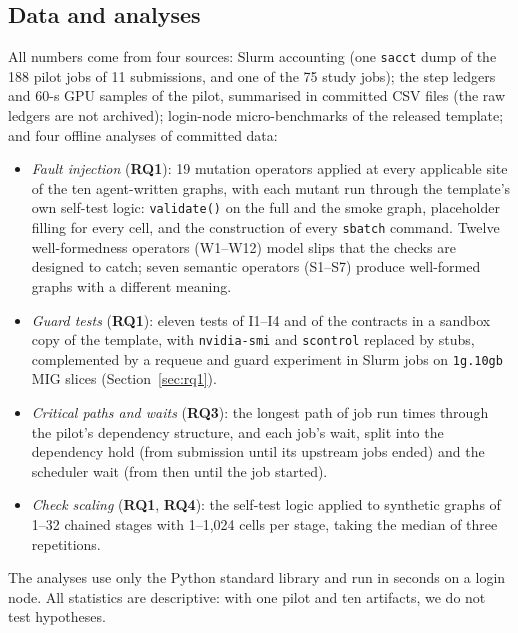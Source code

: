 \documentclass[pdflatex,sn-mathphys-num]{sn-jnl}
\theoremstyle{thmstyletwo}%
\theoremstyle{thmstylethree}%
\newcommand{\code}[1]{\texttt{#1}}
\newcommand{\RQ}[1]{\textbf{RQ#1}}
\newcommand{\I}[1]{\textsf{I#1}}
\begin{document}
\begin{table}[t]
\centering\small
\caption{Selection funnel of the artifact study (generated from \code{data/funnel.csv}).}\label{tab:funnel}

\end{table}

\subsection{Data and analyses}\label{sec:data-sources}

All numbers come from four sources: Slurm accounting (one \code{sacct} dump of the 188 pilot jobs of 11 submissions, and one of the 75 study jobs); the step ledgers and 60-s GPU samples of the pilot, summarised in committed CSV files (the raw ledgers are not archived); login-node micro-benchmarks of the released template; and four offline analyses of committed data:
\begin{itemize}[leftmargin=1.4em, itemsep=1pt]
\item \emph{Fault injection} (\RQ{1}): 19 mutation operators applied at every applicable site of the ten agent-written graphs, with each mutant run through the template's own self-test logic: \code{validate()} on the full and the smoke graph, placeholder filling for every cell, and the construction of every \code{sbatch} command. Twelve well-formedness operators (W1--W12) model slips that the checks are designed to catch; seven semantic operators (S1--S7) produce well-formed graphs with a different meaning.
\item \emph{Guard tests} (\RQ{1}): eleven tests of \I{1}--\I{4} and of the contracts in a sandbox copy of the template, with \code{nvidia-smi} and \code{scontrol} replaced by stubs, complemented by a requeue and guard experiment in Slurm jobs on \code{1g.10gb} MIG slices (Section~\ref{sec:rq1}).
\item \emph{Critical paths and waits} (\RQ{3}): the longest path of job run times through the pilot's dependency structure, and each job's wait, split into the dependency hold (from submission until its upstream jobs ended) and the scheduler wait (from then until the job started).
\item \emph{Check scaling} (\RQ{1}, \RQ{4}): the self-test logic applied to synthetic graphs of 1--32 chained stages with 1--1{,}024 cells per stage, taking the median of three repetitions.
\end{itemize}
The analyses use only the Python standard library and run in seconds on a login node. All statistics are descriptive: with one pilot and ten artifacts, we do not test hypotheses.
\end{document}
